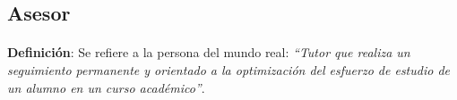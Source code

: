 \subsection{Asesor}

  \paragraph{}\textbf{Definición}: Se refiere a la persona del mundo real:
  \emph{``Tutor que realiza un seguimiento permanente y orientado a la
  optimización del esfuerzo de estudio de un alumno en un curso académico''}.



